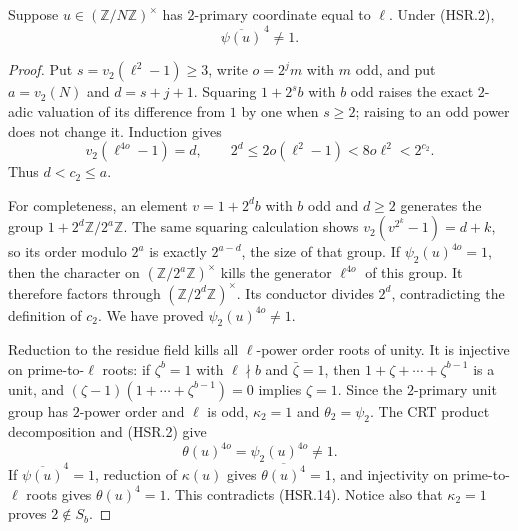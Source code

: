 \begin{lemma}
\label{claim:HSR2}
Suppose $u\in(\mathbb Z/N\mathbb Z)^\times$ has $2$-primary
coordinate equal to $\ell$.  Under (HSR.2),
\[
                         \overline{\psi(u)}^{\,4}\ne1.
 \tag{HSR.12}
\]
\end{lemma}
\begin{proof}
Put $s=v_2(\ell^2-1)\ge3$, write $o=2^jm$ with $m$ odd, and
put $a=v_2(N)$ and $d=s+j+1$.  Squaring $1+2^sb$ with $b$ odd
raises the exact $2$-adic valuation of its difference from $1$ by
one when $s\ge2$; raising to an odd power does not change it.
Induction gives
\[
 v_2(\ell^{4o}-1)=d,\qquad
 2^d\le2o(\ell^2-1)<8o\ell^2<2^{c_2}.
 \tag{HSR.13}
\]
Thus $d<c_2\le a$.

For completeness, an element $v=1+2^d b$ with $b$ odd and $d\ge2$
generates the group $1+2^d\mathbb Z/2^a\mathbb Z$.
The same squaring calculation shows
$v_2(v^{2^k}-1)=d+k$, so its order modulo $2^a$ is exactly
$2^{a-d}$, the size of that group.  If
$\psi_2(u)^{4o}=1$, then the character on
$(\mathbb Z/2^a\mathbb Z)^\times$ kills the generator
$\ell^{4o}$ of this group.  It therefore factors through
$(\mathbb Z/2^d\mathbb Z)^\times$.  Its conductor divides $2^d$,
contradicting the definition of $c_2$.  We have proved
$\psi_2(u)^{4o}\ne1$.

Reduction to the residue field kills all $\ell$-power order roots
of unity.  It is injective on prime-to-$\ell$ roots: if $\zeta^b=1$
with $\ell\nmid b$ and $\bar\zeta=1$, then
$1+\zeta+\cdots+\zeta^{b-1}$ is a unit, and
$(\zeta-1)(1+\cdots+\zeta^{b-1})=0$ implies $\zeta=1$.
Since the $2$-primary unit group has $2$-power order and $\ell$ is
odd, $\kappa_2=1$ and $\theta_2=\psi_2$.  The CRT product
decomposition and (HSR.2) give
\[
                   \theta(u)^{4o}=\psi_2(u)^{4o}\ne1.
 \tag{HSR.14}
\]
If $\overline{\psi(u)}^4=1$, reduction of $\kappa(u)$ gives
$\overline{\theta(u)^4}=1$, and injectivity on prime-to-$\ell$
roots gives $\theta(u)^4=1$.  This contradicts (HSR.14).
Notice also that $\kappa_2=1$ proves $2\notin S_b$.
\end{proof}

